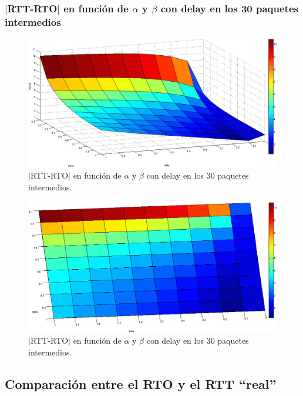 \documentclass[10pt, a4paper]{article}
\begin{document}
\subsubsection{$|$RTT-RTO$|$ en función de $\alpha$ y $\beta$ con delay en los 30 paquetes intermedios}
\begin{figure}[H]
\begin{center}
\includegraphics[width=17cm]{delay-30I.png}
\caption{$|$RTT-RTO$|$ en función de $\alpha$ y $\beta$ con delay en los 30 paquetes intermedios.}
\end{center}
\end{figure}

\begin{figure}[H]
\begin{center}
\includegraphics[width=17cm]{delay-30I-costado.png}
\caption{$|$RTT-RTO$|$ en función de $\alpha$ y $\beta$ con delay en los 30 paquetes intermedios.}
\end{center}
\end{figure}

\subsection{Comparación entre el RTO y el RTT ``real''}
\end{document}

